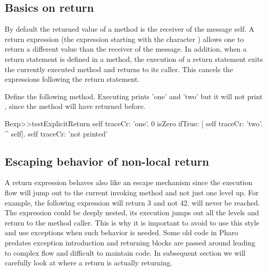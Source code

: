 \documentclass[a4paper,10pt,twoside]{book}
\begin{document}
\subsection{Basics on return}
By default the returned value of a method is the receiver of the message \ie self.
A return expression (the expression starting with the character \ct{^}) allows one to return a different value than the receiver of the message. In addition, when a return statement is defined in a method, the execution of a return statement exits the currently executed method and returns to its caller. This cancels the expressions following the return statement.

Define the following method. Executing   prints 'one' and 'two' but it will not print , since the method  will have returned before.

\begin{code}{}
Bexp>>testExplicitReturn
	self traceCr: 'one'.
	0 isZero ifTrue: [ self traceCr: 'two'. ^ self].
	self traceCr: 'not printed'
\end{code}


%
%


\subsection{Escaping behavior of non-local return}
A return expression behaves also like an escape mechanism since the execution flow will jump out to the current invoking method and not just one level up. For example, the following expression  will return 3 and not 42.  will never be reached. The expression \ct{[ ^3 ]} could be deeply nested, its execution jumps out all the levels and return to the method caller. This is why it is important to avoid to use this style and use exceptions when such behavior is needed. Some old code in Pharo predates exception introduction and returning blocks are passed around leading to complex flow and difficult to maintain code. In subsequent section we will carefully look at where a return is actually returning.
\end{document}
